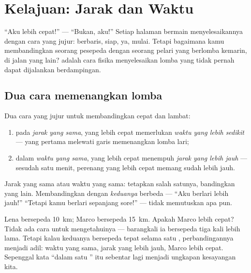 \chapter{Kelajuan: Jarak dan Waktu}\label{ch:g5:speed-distance-time}

``Aku lebih cepat!'' --- ``Bukan, aku!'' Setiap halaman bermain
menyelesaikannya dengan cara yang jujur: berbaris, siap, ya, mulai.
Tetapi bagaimana kamu membandingkan seorang pesepeda dengan seorang
pelari yang berlomba kemarin, di jalan yang lain?  adalah cara
fisika menyelesaikan lomba yang tidak pernah dapat dijalankan
berdampingan.

\section{Dua cara memenangkan lomba}

\begin{proposition}\label{prop:g5:speed-distance-time:rules}
Dua cara yang jujur untuk membandingkan cepat dan lambat:
\begin{enumerate}
  \item pada \emph{jarak yang sama}, yang lebih cepat memerlukan
        \emph{waktu yang lebih sedikit} --- yang pertama melewati
        garis memenangkan lomba lari;
  \item dalam \emph{waktu yang sama}, yang lebih cepat menempuh
        \emph{jarak yang lebih jauh} --- sesudah satu menit, perenang
        yang lebih cepat memang sudah lebih jauh.
\end{enumerate}
Jarak yang sama atau waktu yang sama: tetapkan salah satunya,
bandingkan yang lain. Membandingkan dengan \emph{keduanya} berbeda ---
``Aku berlari lebih jauh!'' ``Tetapi kamu berlari sepanjang sore!''
--- tidak memutuskan apa pun.
\end{proposition}

\begin{example}\label{ex:g5:speed-distance-time:fair}
Lena bersepeda \qty{10}{km}; Marco bersepeda \qty{15}{km}. Apakah
Marco lebih cepat? Tidak ada cara untuk mengetahuinya --- barangkali
ia bersepeda tiga kali lebih lama. Tetapi kalau keduanya bersepeda
tepat selama satu , perbandingannya menjadi adil: waktu yang sama,
jarak yang lebih jauh, Marco lebih cepat. Sepenggal kata ``dalam satu
'' itu sebentar lagi menjadi ungkapan kesayangan kita.
\end{example}

